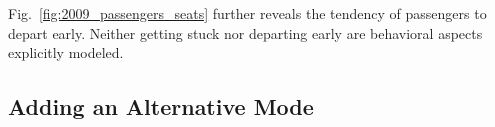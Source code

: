 Fig.~\ref{fig:2009_passengers_seats} further reveals the tendency of passengers to depart early. 
Neither getting stuck nor departing early are behavioral aspects explicitly modeled.  





\subsection{Adding an Alternative Mode}

